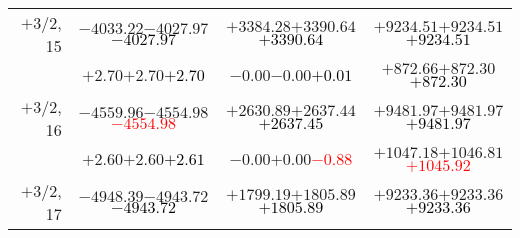 \documentclass[compress]{beamer}
\begin{document}
\begin{frame}
{\begin{tabular}{r | c | c | c}
$+$3/2, 15 & $-4033.22$\hspace{0.1 cm}$-4027.97$\hspace{0.1 cm}\textcolor{black}{$-4027.97$} & $+3384.28$\hspace{0.1 cm}$+3390.64$\hspace{0.1 cm}\textcolor{black}{$+3390.64$} & $+9234.51$\hspace{0.1 cm}$+9234.51$\hspace{0.1 cm}\textcolor{black}{$+9234.51$} \\
           & $+2.70$\hspace{0.1 cm}$+2.70$\hspace{0.1 cm}\textcolor{black}{$+2.70$} & $-0.00$\hspace{0.1 cm}$-0.00$\hspace{0.1 cm}\textcolor{black}{$+0.01$} & $+872.66$\hspace{0.1 cm}$+872.30$\hspace{0.1 cm}\textcolor{black}{$+872.30$} \\
$+$3/2, 16 & $-4559.96$\hspace{0.1 cm}$-4554.98$\hspace{0.1 cm}\textcolor{red}{$-4554.98$} & $+2630.89$\hspace{0.1 cm}$+2637.44$\hspace{0.1 cm}\textcolor{black}{$+2637.45$} & $+9481.97$\hspace{0.1 cm}$+9481.97$\hspace{0.1 cm}\textcolor{black}{$+9481.97$} \\
           & $+2.60$\hspace{0.1 cm}$+2.60$\hspace{0.1 cm}\textcolor{black}{$+2.61$} & $-0.00$\hspace{0.1 cm}$+0.00$\hspace{0.1 cm}\textcolor{red}{$-0.88$} & $+1047.18$\hspace{0.1 cm}$+1046.81$\hspace{0.1 cm}\textcolor{red}{$+1045.92$} \\
$+$3/2, 17 & $-4948.39$\hspace{0.1 cm}$-4943.72$\hspace{0.1 cm}\textcolor{black}{$-4943.72$} & $+1799.19$\hspace{0.1 cm}$+1805.89$\hspace{0.1 cm}\textcolor{black}{$+1805.89$} & $+9233.36$\hspace{0.1 cm}$+9233.36$\hspace{0.1 cm}\textcolor{black}{$+9233.36$} \\

\end{tabular}}
\end{frame}
\end{document}
